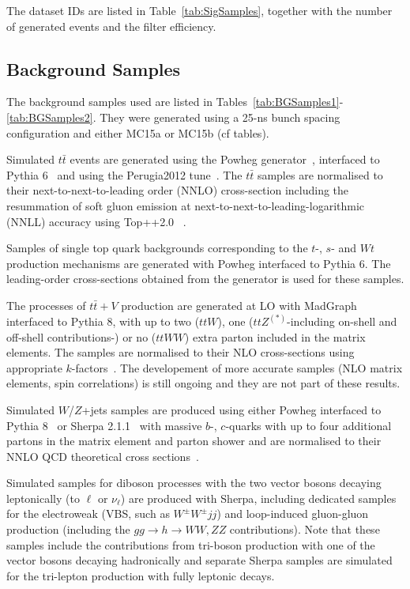 The dataset IDs are listed in Table~\ref{tab:SigSamples}, together with the number of generated events and the filter efficiency. 

\subsection{Background Samples}
\label{sec:BGSamples}

The background samples used are listed in Tables~\ref{tab:BGSamples1}-\ref{tab:BGSamples2}. 
They were generated using a 25-ns bunch spacing configuration and either MC15a or MC15b (cf tables). 

Simulated $t\bar{t}$ events are generated using the {\sc Powheg} generator~\cite{Nason:2004rx,Frixione:2007vw,Alioli:2010xd}, interfaced to {\sc Pythia} 6~\cite{Sjostrand:2006za}
and using the Perugia2012 tune~\cite{Skands:2010ak}. The $t\bar{t}$ samples are normalised to their
next-to-next-to-leading order (NNLO) cross-section including the resummation of
soft gluon emission at next-to-next-to-leading-logarithmic (NNLL) accuracy
using Top++2.0 ~\cite{Czakon:2011xx}.

Samples of single top quark backgrounds corresponding to the $t$-, $s$-
and $Wt$ production mechanisms are generated with {\sc Powheg} interfaced to {\sc Pythia} 6. 
The leading-order cross-sections obtained from the generator is used for these samples. 

The processes of $t\bar{t}+V$ production are generated at LO with {\sc MadGraph}~\cite{madgraph} interfaced to {\sc Pythia} 8, 
with up to two ($ttW$), one ($ttZ^{(*)}$-including on-shell and off-shell contributions-) or no ($ttWW$) extra parton included in the matrix elements. 
The samples are normalised to their NLO cross-sections using appropriate $k$-factors~\cite{madgraph}. 
The developement of more accurate samples (NLO matrix elements, spin correlations) is still ongoing and they are not part of these results. 

Simulated $W$/$Z$+jets samples are produced using either {\sc Powheg} interfaced to {\sc Pythia} 8~\cite{Sjostrand:2006za} 
or {\sc Sherpa} 2.1.1~\cite{gleisberg:2008ta} with massive $b$-, $c$-quarks 
with up to four additional partons in the matrix element and parton shower 
and are normalised to their NNLO QCD theoretical cross sections~\cite{Catani:2009sm}.

% 
Simulated samples for diboson processes with the two vector bosons decaying leptonically (to $\ell$ or $\nu_\ell$) are produced with {\sc Sherpa}, 
including dedicated samples for the electroweak (VBS, such as $W^\pm W^\pm jj$) and loop-induced gluon-gluon production (including the $gg\to h\to WW,ZZ$ contributions). 
Note that these samples include the contributions from tri-boson production with one of the vector bosons decaying hadronically 
and separate Sherpa samples are simulated for the tri-lepton production with fully leptonic decays.

